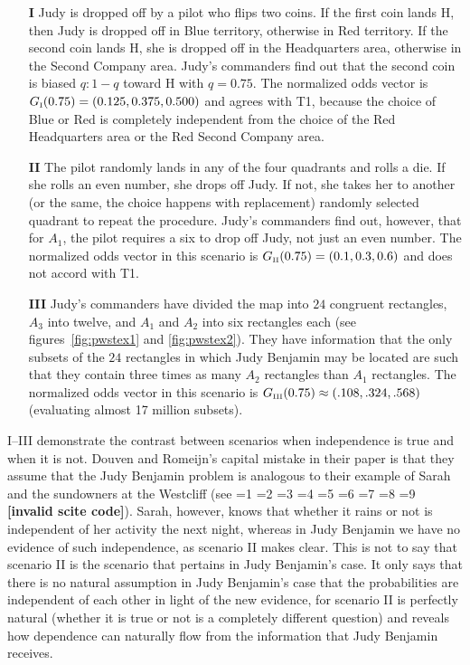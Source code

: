 \documentclass[smallextended]{svjour3}       %
\newcommand{\PageP}{p.~}
\newcommand{\PageP}{}
\newcommand{\scite}[3]{\ifnum#1=1\cite{#2}\else
\ifnum#1=2\cite[{\PageP}~#3]{#2}\else
\ifnum#1=3\cite[{\PageP}~#3]{#2}\else
\ifnum#1=4\cite{#2}\else
\ifnum#1=5\cite{#2}\else
\ifnum#1=6\cite[{\PageP}~#3]{#2}\else
\ifnum#1=7\cite{#2}\else
\ifnum#1=8\cite[{\PageP}~#3]{#2}\else
\ifnum#1=9\cite[{\PageP}~#3]{#2}\else
\textbf{[invalid scite code]}\fi\fi\fi\fi\fi\fi\fi\fi\fi}
\begin{document}
\begin{enumerate}
\item[\textbf{I}] Judy is dropped off by a pilot who flips two
  coins. If the first coin lands H, then Judy is dropped off in Blue
  territory, otherwise in Red territory. If the second coin lands H,
  she is dropped off in the Headquarters area, otherwise in the
  Second Company area. Judy's commanders find out that the second coin
  is biased $q:1-q$ toward H with $q=0.75$. The normalized odds
  vector is $G_{\mbox{\tiny I}}(0.75)=(0.125,0.375,0.500)$ and agrees
  with T1, because the choice of Blue or Red is completely independent
  from the choice of the Red Headquarters area or the Red Second
  Company area.
\item[\textbf{II}] The pilot randomly lands in any of the four
  quadrants and rolls a die. If she rolls an even number, she drops
  off Judy. If not, she takes her to another (or the same, the choice
  happens with replacement) randomly selected quadrant to repeat the
  procedure. Judy's commanders find out, however, that for $A_{1}$,
  the pilot requires a six to drop off Judy, not just an even number.
  The normalized odds vector in this scenario is $G_{\mbox{\tiny
      II}}(0.75)=(0.1,0.3,0.6)$ and does not accord with T1.
\item[\textbf{III}] Judy's commanders have divided the map into $24$
  congruent rectangles, $A_{3}$ into twelve, and $A_{1}$ and $A_{2}$
  into six rectangles each (see figures~\ref{fig:pwstex1} and
  \ref{fig:pwstex2}). They have information that the only subsets of
  the $24$ rectangles in which Judy Benjamin may be located are such
  that they contain three times as many $A_{2}$ rectangles than
  $A_{1}$ rectangles. The normalized odds vector in this scenario is
  $G_{\mbox{\tiny III}}(0.75)\approx(.108,.324,.568)$ (evaluating almost
  17 million subsets).
\end{enumerate}

I--III demonstrate the contrast between scenarios when independence is
true and when it is not. Douven and Romeijn's capital mistake in their
paper is that they assume that the Judy Benjamin problem is analogous
to their example of Sarah and the sundowners at the Westcliff (see
\scite{8}{douvenromeijn09}{7}). Sarah, however, knows that whether it
rains or not is independent of her activity the next night, whereas in
Judy Benjamin we have no evidence of such independence, as scenario II
makes clear. This is not to say that scenario II is the scenario that
pertains in Judy Benjamin's case. It only says that there is no
natural assumption in Judy Benjamin's case that the probabilities are
independent of each other in light of the new evidence, for scenario
II is perfectly natural (whether it is true or not is a completely
different question) and reveals how dependence can naturally flow from
the information that Judy Benjamin receives. 
\end{document}
